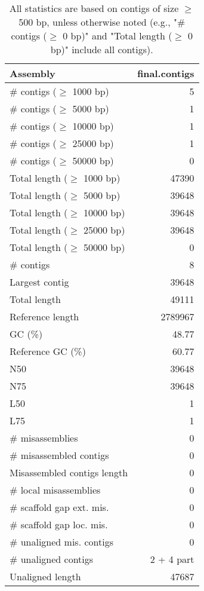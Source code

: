 \documentclass[12pt,a4paper]{article}
\begin{document}
\begin{table}[ht]
\begin{center}
\caption{All statistics are based on contigs of size $\geq$ 500 bp, unless otherwise noted (e.g., "\# contigs ($\geq$ 0 bp)" and "Total length ($\geq$ 0 bp)" include all contigs).}
\begin{tabular}{|l*{1}{|r}|}
\hline
Assembly & final.contigs \\ \hline
\# contigs ($\geq$ 1000 bp) & 5 \\ \hline
\# contigs ($\geq$ 5000 bp) & 1 \\ \hline
\# contigs ($\geq$ 10000 bp) & 1 \\ \hline
\# contigs ($\geq$ 25000 bp) & 1 \\ \hline
\# contigs ($\geq$ 50000 bp) & 0 \\ \hline
Total length ($\geq$ 1000 bp) & 47390 \\ \hline
Total length ($\geq$ 5000 bp) & 39648 \\ \hline
Total length ($\geq$ 10000 bp) & 39648 \\ \hline
Total length ($\geq$ 25000 bp) & 39648 \\ \hline
Total length ($\geq$ 50000 bp) & 0 \\ \hline
\# contigs & 8 \\ \hline
Largest contig & 39648 \\ \hline
Total length & 49111 \\ \hline
Reference length & 2789967 \\ \hline
GC (\%) & 48.77 \\ \hline
Reference GC (\%) & 60.77 \\ \hline
N50 & 39648 \\ \hline
N75 & 39648 \\ \hline
L50 & 1 \\ \hline
L75 & 1 \\ \hline
\# misassemblies & 0 \\ \hline
\# misassembled contigs & 0 \\ \hline
Misassembled contigs length & 0 \\ \hline
\# local misassemblies & 0 \\ \hline
\# scaffold gap ext. mis. & 0 \\ \hline
\# scaffold gap loc. mis. & 0 \\ \hline
\# unaligned mis. contigs & 0 \\ \hline
\# unaligned contigs & 2 + 4 part \\ \hline
Unaligned length & 47687 \\ \hline

\end{tabular}
\end{center}
\end{table}
\end{document}
